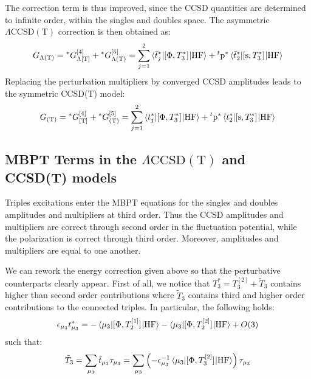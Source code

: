 The correction term is thus improved, since the \acrshort{CCSD} quantities
are determined to infinite order, within the singles and doubles space.
The asymmetric $\Lambda\text{CCSD}(\text{T})$ correction is then
obtained as:
\begin{equation}\label{eq:5-lambda-parens-t}
 \begin{aligned}
  G_{\Lambda(\text{T})} =
  {}^*G_{\Lambda[\text{T}]}^{[4]} +
  {}^*G_{\Lambda(\text{T})}^{[5]} =
  \sum_{j=1}^2
    \braket{\bar{t}_{j}^{*} | [ \Phi, T_3^{*} ]^{} | \mathrm{HF}}
  + {}^t\mathrm{p}^{*}\braket{\bar{t}_{2}^{*} | [ \mathrm{s}, T_3^{*} ]^{} | \mathrm{HF}}
 \end{aligned}
\end{equation}
Replacing the perturbation multipliers by converged \acrshort{CCSD}
amplitudes leads to the symmetric CCSD(T) model:
\begin{equation}\label{eq:5-parens-t}
 \begin{aligned}
  G_{(\text{T})} =
  {}^*G_{[\text{T}]}^{[4]} +
  {}^*G_{(\text{T})}^{[5]} =
  \sum_{j=1}^2
    \braket{t_{j}^{*} | [ \Phi, T_3^{*} ]^{} | \mathrm{HF}}
  + {}^t\mathrm{p}^{*}\braket{t_{2}^{*} | [ \mathrm{s}, T_3^{*} ]^{} | \mathrm{HF}}
 \end{aligned}
\end{equation}

\subsection{MBPT Terms in the
\texorpdfstring{$\Lambda\text{CCSD}(\text{T})$}{CCSD(aT)} and CCSD(T) models}

Triples excitations enter the \acrshort{MBPT} equations for the singles and
doubles amplitudes and multipliers at third order. Thus the \acrshort{CCSD}
amplitudes and multipliers are correct through second order in the
fluctuation potential, while the polarization is correct through third
order. Moreover, amplitudes and multipliers are equal to one another.

We can rework the energy correction given above so that the perturbative
counterparts clearly appear.
First of all, we notice that $T_3^{*} = T_3^{[2]} + \tilde{T}_3$ contains higher than second order
contributions where $\tilde{T}_3$ contains third and higher order contributions to the
connected triples. In particular, the following holds:
\begin{equation}
  \epsilon_{\mu_3}t_{\mu_3}^{*} =
  - \braket{\mu_3 |[ \Phi, T_2^{[1]} ]^{} | \mathrm{HF}}
  - \braket{\mu_3 | [ \Phi, T_2^{[2]} ]^{} | \mathrm{HF}}
  + O(3)
\end{equation}
such that:
\begin{equation}
  \tilde{T}_3
  = \sum_{\mu_3}\tilde{t}_{\mu_3}\tau_{\mu_3}
  = \sum_{\mu_3}
  \left(-\epsilon_{\mu_3}^{-1}\braket{\mu_3 |
  [ \Phi, T_3^{[2]} ]^{}
  | \mathrm{HF}}\right)
  \tau_{\mu_3}
\end{equation}


